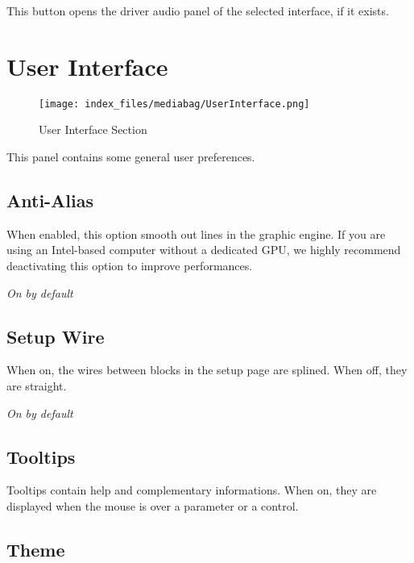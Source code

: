 \documentclass[
  letterpaper,
  DIV=11,
  numbers=noendperiod]{scrreport}
\begin{document}
This button opens the driver audio panel of the selected interface, if
it exists.

\hypertarget{user-interface}{%
\section{User Interface}\label{user-interface}}

\begin{figure}

{\centering \texttt{[image: index\_files/mediabag/UserInterface.png]}

}

\caption{User Interface Section}

\end{figure}

This panel contains some general user preferences.

\hypertarget{anti-alias}{%
\subsection{Anti-Alias}\label{anti-alias}}

When enabled, this option smooth out lines in the graphic engine. If you
are using an Intel-based computer without a dedicated GPU, we highly
recommend deactivating this option to improve performances.

\emph{On by default}

\hypertarget{setup-wire}{%
\subsection{Setup Wire}\label{setup-wire}}

When on, the wires between blocks in the setup page are splined. When
off, they are straight.

\emph{On by default}

\hypertarget{tooltips}{%
\subsection{Tooltips}\label{tooltips}}

Tooltips contain help and complementary informations. When on, they are
displayed when the mouse is over a parameter or a control.

\hypertarget{theme}{%
\subsection{Theme}\label{theme}}
\end{document}
